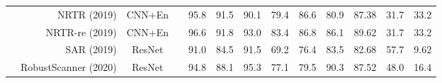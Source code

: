 \documentclass[10pt,journal,compsoc]{IEEEtran}
\begin{document}
\begin{table*}[t]
{\begin{tabular}{c|r|c|c|ccc|ccc|c|cc}
                        & NRTR \cite{Sheng2019nrtr} (2019)   & CNN+En    &           & 95.8          & 91.5          & 90.1          &     79.4          &   86.6            &     80.9          &                                                       87.38                      & 31.7                                                                    & 33.2                                                              \\
                        & NRTR-re\cite{Sheng2019nrtr} (2019)& CNN+En &             & 96.6          & 91.8          & 93.0          & 83.4          & 86.8          & 86.1          & 89.62                                                                       & 31.7                                                                    & 33.2                                                              \\
                       
                        & SAR \cite{li2019sar} (2019)& ResNet     &            & 91.0          & 84.5          & 91.5          & 69.2          & 76.4          & 83.5          & 82.68                                                                       & 57.7                                                                    & 9.62                                                             \\
                        & RobustScanner \cite{yue2020robustscanner} (2020)& ResNet      &    & 94.8          & 88.1          & 95.3          & 77.1          & 79.5          & 90.3          & 87.52                                                                       &                 48.0                                                        &  16.4                                                                    \\
                        

\end{tabular}}
\end{table*}
\end{document}
